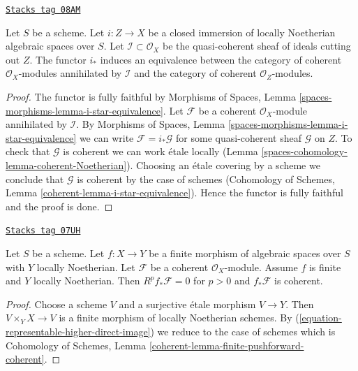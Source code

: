 \begin{lemma}
\label{spaces-cohomology-lemma-i-star-equivalence}
\href{https://stacks.math.columbia.edu/tag/08AM}{\texttt{Stacks tag 08AM}}

Let $S$ be a scheme. Let $i : Z \to X$ be a closed immersion of locally
Noetherian algebraic spaces over $S$.
Let $\mathcal{I} \subset \mathcal{O}_X$ be the quasi-coherent sheaf of ideals
cutting out $Z$. The functor $i_*$ induces an equivalence between the
category of coherent $\mathcal{O}_X$-modules annihilated by $\mathcal{I}$
and the category of coherent $\mathcal{O}_Z$-modules.
\end{lemma}

\begin{proof}
The functor is fully faithful by
Morphisms of Spaces, Lemma \ref{spaces-morphisms-lemma-i-star-equivalence}.
Let $\mathcal{F}$ be a coherent $\mathcal{O}_X$-module
annihilated by $\mathcal{I}$. By
Morphisms of Spaces, Lemma \ref{spaces-morphisms-lemma-i-star-equivalence}
we can write $\mathcal{F} = i_*\mathcal{G}$ for some quasi-coherent
sheaf $\mathcal{G}$ on $Z$. To check that $\mathcal{G}$ is coherent
we can work \'etale locally (Lemma \ref{spaces-cohomology-lemma-coherent-Noetherian}).
Choosing an \'etale covering by a scheme we conclude that
$\mathcal{G}$ is coherent by the case of schemes
(Cohomology of Schemes, Lemma \ref{coherent-lemma-i-star-equivalence}).
Hence the functor is fully faithful and the proof is done.
\end{proof}

\begin{lemma}
\label{spaces-cohomology-lemma-finite-pushforward-coherent}
\href{https://stacks.math.columbia.edu/tag/07UH}{\texttt{Stacks tag 07UH}}

Let $S$ be a scheme. Let $f : X \to Y$ be a finite morphism of algebraic
spaces over $S$ with $Y$ locally Noetherian. Let $\mathcal{F}$ be a
coherent $\mathcal{O}_X$-module. Assume $f$ is finite and $Y$ locally
Noetherian. Then $R^pf_*\mathcal{F} = 0$ for $p > 0$ and
$f_*\mathcal{F}$ is coherent.
\end{lemma}

\begin{proof}
Choose a scheme $V$ and a surjective \'etale morphism $V \to Y$.
Then $V \times_Y X \to V$ is a finite morphism of locally Noetherian
schemes. By (\ref{equation-representable-higher-direct-image}) we reduce
to the case of schemes which is
Cohomology of Schemes, Lemma \ref{coherent-lemma-finite-pushforward-coherent}.
\end{proof}


